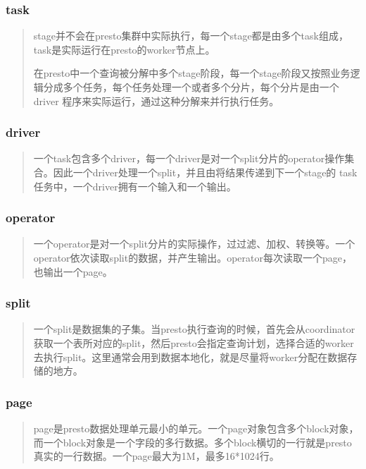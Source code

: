 \documentclass[letterpaper,10pt,english]{sphinxmanual}
\begin{document}
\subsubsection{task}
\label{\detokenize{overview/concept:task}}\begin{quote}

stage并不会在presto集群中实际执行，每一个stage都是由多个task组成，task是实际运行在presto的worker节点上。

在presto中一个查询被分解中多个stage阶段，每一个stage阶段又按照业务逻辑分成多个任务，每个任务处理一个或者多个分片，每个分片是由一个driver
程序来实际运行，通过这种分解来并行执行任务。
\end{quote}


\subsubsection{driver}
\label{\detokenize{overview/concept:driver}}\begin{quote}

一个task包含多个driver，每一个driver是对一个split分片的operator操作集合。因此一个driver处理一个split，并且由将结果传递到下一个stage的
task任务中，一个driver拥有一个输入和一个输出。
\end{quote}


\subsubsection{operator}
\label{\detokenize{overview/concept:operator}}\begin{quote}

一个operator是对一个split分片的实际操作，过过滤、加权、转换等。一个operator依次读取split的数据，并产生输出。operator每次读取一个page，
也输出一个page。
\end{quote}


\subsubsection{split}
\label{\detokenize{overview/concept:split}}\begin{quote}

一个split是数据集的子集。当presto执行查询的时候，首先会从coordinator获取一个表所对应的split，然后presto会指定查询计划，选择合适的worker
去执行split。这里通常会用到数据本地化，就是尽量将worker分配在数据存储的地方。
\end{quote}


\subsubsection{page}
\label{\detokenize{overview/concept:page}}\begin{quote}

page是presto数据处理单元最小的单元。一个page对象包含多个block对象，而一个block对象是一个字段的多行数据。多个block横切的一行就是presto
真实的一行数据。一个page最大为1M，最多16*1024行。

\noindent{}
\end{quote}
\end{document}

